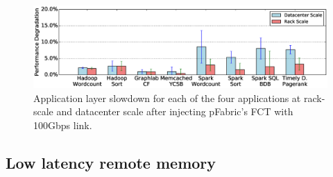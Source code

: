 %
\begin{figure}
  \centering
    \includegraphics[width = 5.5in]{img/slowdown.eps} 
  \caption{\small{Application layer slowdown for each of the four applications at rack-scale and datacenter scale after injecting pFabric's FCT with 100Gbps link. }}
  \label{fig:appfabric100}
\end{figure}
%



\subsection{Low latency remote memory}
